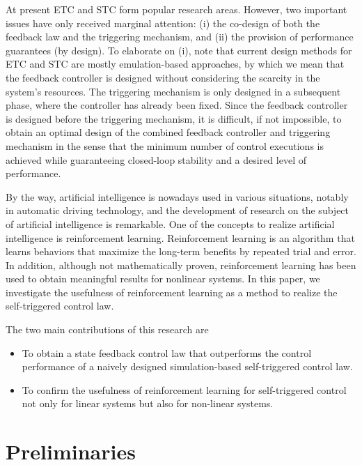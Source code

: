 \documentclass[english, dvipdfmx]{ampmt}             %
\begin{document}
At present ETC and STC form popular research areas. However, two important issues have only received marginal attention: (i) the co-design of both the feedback law and the triggering mechanism, and (ii) the provision of performance guarantees (by design). To elaborate on (i), note that current design methods for ETC and STC are mostly emulation-based approaches, by which we mean that the feedback controller is designed without considering the scarcity in the system’s resources. The triggering mechanism is only designed in a subsequent phase, where the controller has already been fixed. Since the feedback controller is designed before the triggering mechanism, it is difficult, if not impossible, to obtain an optimal design of the combined feedback controller and triggering mechanism in the sense that the minimum number of control executions is achieved while guaranteeing closed-loop stability and a desired level of performance. \par
By the way, artificial intelligence is nowadays used in various situations, notably in automatic driving technology, and the development of research on the subject of artificial intelligence is remarkable. One of the concepts to realize artificial intelligence is reinforcement learning. Reinforcement learning is an algorithm that learns behaviors that maximize the long-term benefits by repeated trial and error. In addition, although not mathematically proven, reinforcement learning has been used to obtain meaningful results for nonlinear systems. In this paper, we investigate the usefulness of reinforcement learning as a method to realize the self-triggered control law. \par
The two main contributions of this research are
\begin{itemize}
	\item To obtain a state feedback control law that outperforms the control performance of a naively designed simulation-based self-triggered control law.
	\item To confirm the usefulness of reinforcement learning for self-triggered control not only for linear systems but also for non-linear systems.
\end{itemize}




\section{Preliminaries}
\end{document}
